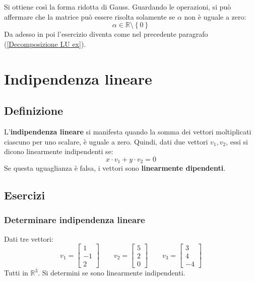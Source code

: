 \documentclass[a4paper]{article}
\begin{document}
	Si ottiene così la forma ridotta di Gauss. Guardando le operazioni, si può affermare che la matrice può essere risolta solamente se $\alpha$ non è uguale a zero:
	\begin{equation*}
		\alpha \in \mathbb{R} \setminus \left\{0\right\}
	\end{equation*}
	Da adesso in poi l'esercizio diventa come nel precedente paragrafo (\ref{Decomposizione LU ex}).\newpage
	
	\section{Indipendenza lineare}
	
	\subsection{Definizione}
	
	L'\textbf{indipendenza lineare} si manifesta quando la somma dei vettori moltiplicati ciascuno per uno scalare, è uguale a zero. Quindi, dati due vettori $v_{1}, v_{2}$, essi si dicono linearmente indipendenti se:
	\begin{equation*}
		x \cdot v_{1} + y \cdot v_{2} = 0
	\end{equation*}
	Se questa uguaglianza è falsa, i vettori sono \textbf{linearmente dipendenti}.
	
	\subsection{Esercizi}
	
	\subsubsection{Determinare indipendenza lineare}
	
	Dati tre vettori:
	\begin{equation*}
		v_{1} = \begin{bmatrix}
			1  \\
			-1 \\
			2
		\end{bmatrix} \hspace{2em}
		v_{2} = \begin{bmatrix}
			5 \\
			2 \\
			0
		\end{bmatrix} \hspace{2em}
		v_{3} = \begin{bmatrix}
			3 \\
			4 \\
			-4
		\end{bmatrix}
	\end{equation*}
	Tutti in $\mathbb{R}^{3}$. Si determini se sono linearmente indipendenti.\newline
	
\end{document}
